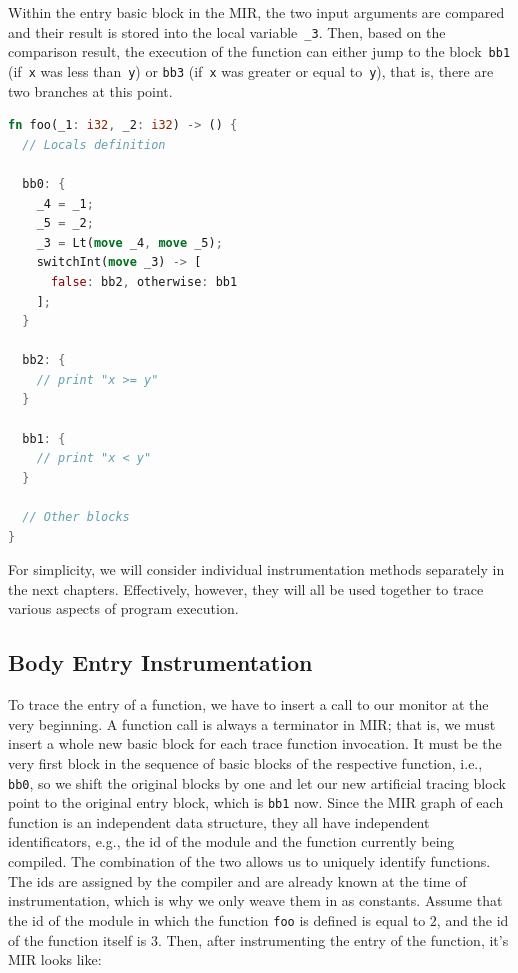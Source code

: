 \documentclass[paper=a4,%
  twoside,%
  BCOR4mm,%
  abstract=true,%
  toc=bibliography,%
  chapterprefix=true,%
  toc=bibliographynumbered,%
  open=right,%
  english,%
  pagesize=pdftex]{scrreprt}
\begin{document}
Within the entry basic block in the \ac{MIR}, the two input arguments are compared and their result is stored into the local variable~\lstinline{_3}. Then, based on the comparison result, the execution of the function can either jump to the block~\lstinline{bb1} (if~\lstinline{x} was less than~\lstinline{y}) or \lstinline{bb3} (if~\lstinline{x} was greater or equal to~\lstinline{y}), that is, there are two branches at this point.
\begin{lstlisting}[language=Rust, style=boxed, caption={MIR of the \lstinline{foo} function}, label=lst:mir-of-example-function-to-instrument]
fn foo(_1: i32, _2: i32) -> () {
  // Locals definition

  bb0: {
    _4 = _1;
    _5 = _2;
    _3 = Lt(move _4, move _5);
    switchInt(move _3) -> [
      false: bb2, otherwise: bb1
    ];
  }

  bb2: {
    // print "x >= y"
  }

  bb1: {
    // print "x < y"
  }

  // Other blocks
}
\end{lstlisting}

For simplicity, we will consider individual instrumentation methods separately in the next chapters. Effectively, however, they will all be used together to trace various aspects of program execution.

\subsection{Body Entry Instrumentation}
To trace the entry of a function, we have to insert a call to our monitor at the very beginning. A function call is always a terminator in \ac{MIR}; that is, we must insert a whole new basic block for each trace function invocation. It must be the very first block in the sequence of basic blocks of the respective function, i.e., \lstinline{bb0}, so we shift the original blocks by one and let our new artificial tracing block point to the original entry block, which is \lstinline{bb1} now. Since the \ac{MIR} graph of each function is an independent data structure, they all have independent identificators, e.g., the id of the module and the function currently being compiled. The combination of the two allows us to uniquely identify functions. The ids are assigned by the compiler and are already known at the time of instrumentation, which is why we only weave them in as constants. Assume that the id of the module in which the function \lstinline{foo} is defined is equal to $2$, and the id of the function itself is $3$. Then, after instrumenting the entry of the function, it's \ac{MIR} looks like:
\end{document}
